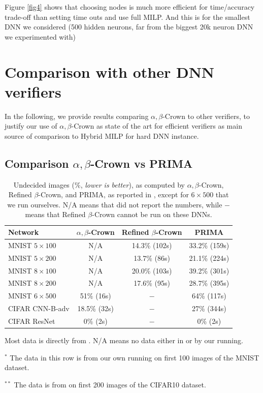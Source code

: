 Figure \ref{fig4} shows that choosing nodes is much more efficient for time/accuracy trade-off than setting time outs and use full MILP. And this is for the smallest DNN we considered (500 hidden neurons, far from the biggest 20k neuron DNN we experimented with)


\section{Comparison with other DNN verifiers}

In the following, we provide results comparing $\alpha,\beta$-Crown to other verifiers, to justify our use of $\alpha,\beta$-Crown as state of the art for efficient verifiers as main source of comparison to Hybrid MILP for hard DNN instance.


\subsection*{Comparison $\alpha,\beta$-Crown vs PRIMA}


\begin{table}[h!]
	\centering
	\begin{tabular}{||l||c|c||c||}
		\hline \hline
		Network & $\alpha,\beta$-Crown & Refined $\beta$-Crown & PRIMA \\ 		  
		\hline
		MNIST $5 \times 100$ & N/A  & 14.3\% (102s) & 33.2\% (159s)\\ \hline
		MNIST $5 \times 200$ & N/A & 13.7\% (86s) & 21.1\% (224s) \\ \hline
		MNIST $8 \times 100$ & N/A  & 20.0\% (103s) & 39.2\% (301s)   \\ \hline
		MNIST $8 \times 200$ & N/A & 17.6\% (95s) & 28.7\% (395s)  \\ \hline
		MNIST $6 \times 500$ & 51\% (16s) & $-$ & 64\% (117s) \\ \hline
		CIFAR CNN-B-adv & 18.5\% (32s) & $-$ & 27\% (344s)\\ \hline \hline
		CIFAR ResNet & 0\% (2s) & $-$ & 0\% (2s) \\ \hline \hline
	\end{tabular}
	\caption{Undecided images ($\%$, {\em lower is better}), as computed by $\alpha,\beta$-Crown, Refined $\beta$-Crown, and PRIMA, as reported in \cite{crown}, except for $6 \times 500$ that we run ourselves. N/A means that \cite{crown} did not report the numbers, while $-$ means that Refined $\beta$-Crown cannot be run on these DNNs.}
	\label{table9}
	\begin{tablenotes}
		\footnotesize
		\item Most data is directly from \cite{crown}. N/A means no data either in \cite{crown} or by our running.
		\item  $^*$ The data in this row is from our own running on first 100 images of the MNIST dataset.
		\item  $^{**}$ The data is from \cite{crown} on first 200 images of the CIFAR10 dataset.
	\end{tablenotes}
	\end{table}


